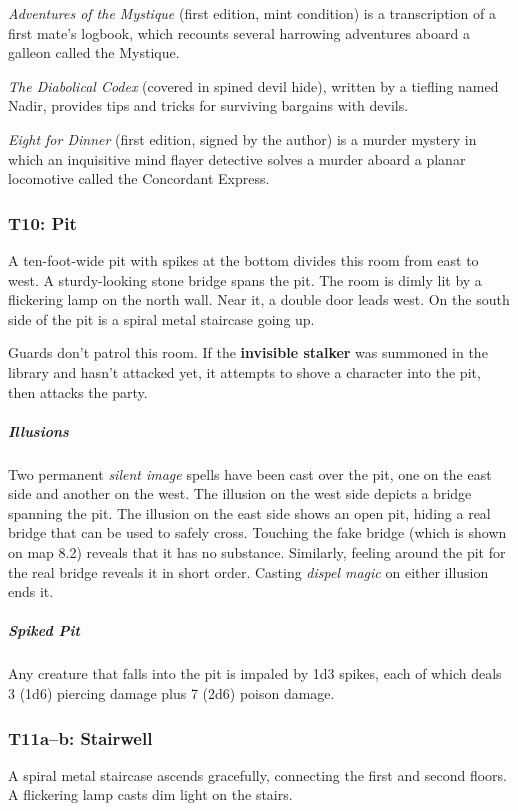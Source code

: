 \documentclass[10pt,a4paper,twoside,bg=print,twocolumn,openany,nodeprecatedcode]{dndbook}
\begin{document}
\textit{Adventures of the Mystique} (first edition, mint condition) is a transcription of a first mate's logbook, which recounts several harrowing adventures aboard a galleon called the Mystique.

\textit{The Diabolical Codex} (covered in spined devil hide), written by a tiefling named Nadir, provides tips and tricks for surviving bargains with devils.

\textit{Eight for Dinner} (first edition, signed by the author) is a murder mystery in which an inquisitive mind flayer detective solves a murder aboard a planar locomotive called the Concordant Express.

\subsubsection{T10: Pit}
\begin{DndReadAloud}{}
A ten-foot-wide pit with spikes at the bottom divides this room from east to west. A sturdy-looking stone bridge spans the pit. The room is dimly lit by a flickering lamp on the north wall. Near it, a double door leads west. On the south side of the pit is a spiral metal staircase going up.

\end{DndReadAloud}

Guards don't patrol this room. If the \textbf{invisible stalker} was summoned in the library and hasn't attacked yet, it attempts to shove a character into the pit, then attacks the party.

\subparagraph{Illusions}
Two permanent \textit{silent image} spells have been cast over the pit, one on the east side and another on the west. The illusion on the west side depicts a bridge spanning the pit. The illusion on the east side shows an open pit, hiding a real bridge that can be used to safely cross. Touching the fake bridge (which is shown on map 8.2) reveals that it has no substance. Similarly, feeling around the pit for the real bridge reveals it in short order. Casting \textit{dispel magic} on either illusion ends it.

\subparagraph{Spiked Pit}
Any creature that falls into the pit is impaled by 1d3 spikes, each of which deals 3 (1d6) piercing damage plus 7 (2d6) poison damage.

\subsubsection{T11a–b: Stairwell}
\begin{DndReadAloud}{}
A spiral metal staircase ascends gracefully, connecting the first and second floors. A flickering lamp casts dim light on the stairs.

\end{DndReadAloud}
\end{document}
